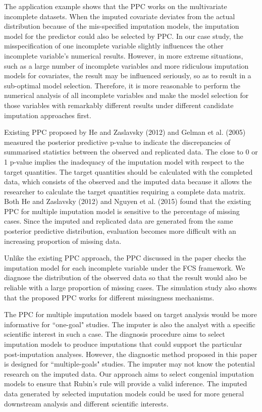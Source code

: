 \documentclass[12pt, fullpage, a4paper]{article}
\begin{document}
The application example shows that the PPC works on the multivariate incomplete datasets. When the imputed covariate deviates from the actual distribution because of the mis-specified imputation models, the imputation model for the predictor could also be selected by PPC. In our case study, the misspecification of one incomplete variable slightly influences the other incomplete variable's numerical results. However, in more extreme situations, such as a large number of incomplete variables and more ridiculous imputation models for covariates, the result may be influenced seriously, so as to result in a sub-optimal model selection. Therefore, it is more reasonable to perform the numerical analysis of all incomplete variables and make the model selection for those variables with remarkably different results under different candidate imputation approaches first. 


Existing PPC proposed by He and Zaslavsky (2012) and Gelman et al. (2005) measured the posterior predictive p-value to indicate the discrepancies of summarised statistics between the observed and replicated data. The close to 0 or 1 p-value implies the inadequacy of the imputation model with respect to the target quantities. The target quantities should be calculated with the completed data, which consists of the observed and the imputed data because it allows the researcher to calculate the target quantities requiring a complete data matrix. Both He and Zaslavsky (2012) and Nguyen et al. (2015) found that the existing PPC for multiple imputation model is sensitive to the percentage of missing cases. Since the imputed and replicated data are generated from the same posterior predictive distribution, evaluation becomes more difficult with an increasing proportion of missing data.


Unlike the existing PPC approach, the PPC discussed in the paper checks the imputation model for each incomplete variable under the FCS framework. We diagnose the distribution of the observed data so that the result would also be reliable with a large proportion of missing cases. The simulation study also shows that the proposed PPC works for different missingness mechanisms. 


The PPC for multiple imputation models based on target analysis would be more informative for ``one-goal" studies. The imputer is also the analyst with a specific scientific interest in such a case. The diagnosis procedure aims to select imputation models to produce imputations that could support the particular post-imputation analyses. However, the diagnostic method proposed in this paper is designed for ``multiple-goals" studies. The imputer may not know the potential research on the imputed data. Our approach aims to select congenial imputation models to ensure that Rubin's rule will provide a valid inference. The imputed data generated by selected imputation models could be used for more general downstream analysis and different scientific interests.
\end{document}
